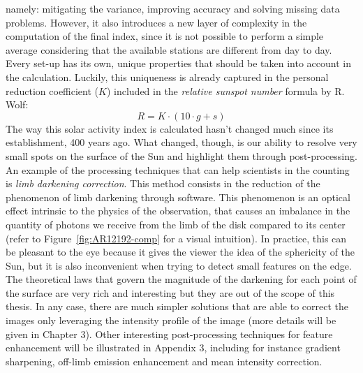 namely: mitigating the variance, improving accuracy and solving missing data problems. However, it also introduces a new layer of complexity in the computation of the final index, since it is not possible to perform a simple average considering that the available stations are different from day to day. Every set-up has its own, unique properties that should be taken into account in the calculation. Luckily, this uniqueness is already captured in the personal reduction coefficient ($K$) included in the \textit{relative sunspot number} formula by R. Wolf:
\begin{equation}
R = K \cdot (10 \cdot g + s)
\end{equation}
The way this solar activity index is calculated hasn't changed much since its establishment, 400 years ago. What changed, though, is our ability to resolve very small spots on the surface of the Sun and highlight them through post-processing. \\
An example of the processing techniques that can help scientists in the counting is \textit{limb darkening correction}. This method consists in the reduction of the phenomenon of limb darkening through software. This phenomenon is an optical effect intrinsic to the physics of the observation, that causes an imbalance in the quantity of photons we receive from the limb of the disk compared to its center (refer to Figure~\ref{fig:AR12192-comp} for a visual intuition). In practice, this can be pleasant to the eye because it gives the viewer the idea of the sphericity of the Sun, but it is also inconvenient when trying to detect small features on the edge. The theoretical laws that govern the magnitude of the darkening for each point of the surface are very rich and interesting but they are out of the scope of this thesis. In any case, there are much simpler solutions that are able to correct the images only leveraging the intensity profile of the image (more details will be given in Chapter 3). Other interesting post-processing techniques for feature enhancement will be illustrated in Appendix 3, including for instance gradient sharpening, off-limb emission enhancement and mean intensity correction. \\
